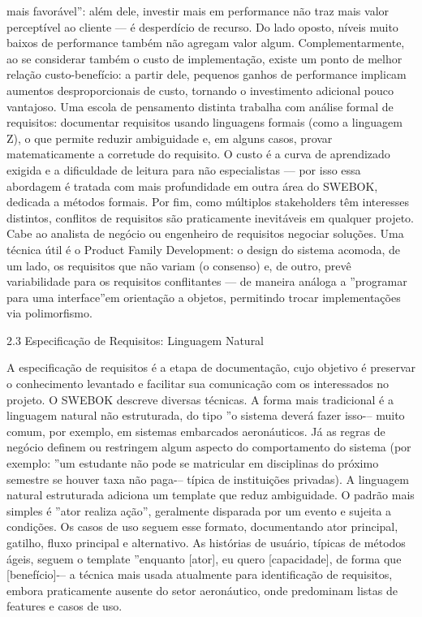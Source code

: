 mais favorável”: além dele, investir mais em performance não traz mais valor perceptível ao cliente — é desperdício de recurso. Do lado oposto, níveis muito baixos de performance também não agregam valor algum. Complementarmente, ao se considerar também o custo de implementação, existe um ponto de melhor relação custo-benefício: a partir dele, pequenos ganhos de performance implicam aumentos desproporcionais de custo, tornando o investimento adicional pouco vantajoso. Uma escola de pensamento distinta trabalha com análise formal de requisitos: documentar requisitos usando linguagens formais (como a linguagem Z), o que permite reduzir ambiguidade e, em alguns casos, provar matematicamente a corretude do requisito. O custo é a curva de aprendizado exigida e a dificuldade de leitura para não especialistas — por isso essa abordagem é tratada com mais profundidade em outra área do SWEBOK, dedicada a métodos formais. Por fim, como múltiplos stakeholders têm interesses distintos, conflitos de requisitos são praticamente inevitáveis em qualquer projeto. Cabe ao analista de negócio ou engenheiro de requisitos negociar soluções. Uma técnica útil é o Product Family Development: o design do sistema acomoda, de um lado, os requisitos que não variam (o consenso) e, de outro, prevê variabilidade para os requisitos conflitantes — de maneira análoga a ”programar para uma interface”em orientação a objetos, permitindo trocar implementações via polimorfismo.

2.3 Especificação de Requisitos: Linguagem Natural

A especificação de requisitos é a etapa de documentação, cujo objetivo é preservar o conhecimento levantado e facilitar sua comunicação com os interessados no projeto. O SWEBOK descreve diversas técnicas. A forma mais tradicional é a linguagem natural não estruturada, do tipo ”o sistema deverá fazer isso-– muito comum, por exemplo, em sistemas embarcados aeronáuticos. Já as regras de negócio definem ou restringem algum aspecto do comportamento do sistema (por exemplo: ”um estudante não pode se matricular em disciplinas do próximo semestre se houver taxa não paga-– típica de instituições privadas). A linguagem natural estruturada adiciona um template que reduz ambiguidade. O padrão mais simples é ”ator realiza ação”, geralmente disparada por um evento e sujeita a condições. Os casos de uso seguem esse formato, documentando ator principal, gatilho, fluxo principal e alternativo. As histórias de usuário, típicas de métodos ágeis, seguem o template ”enquanto [ator], eu quero [capacidade], de forma que [benefício]-– a técnica mais usada atualmente para identificação de requisitos, embora praticamente ausente do setor aeronáutico, onde predominam listas de features e casos de uso.

